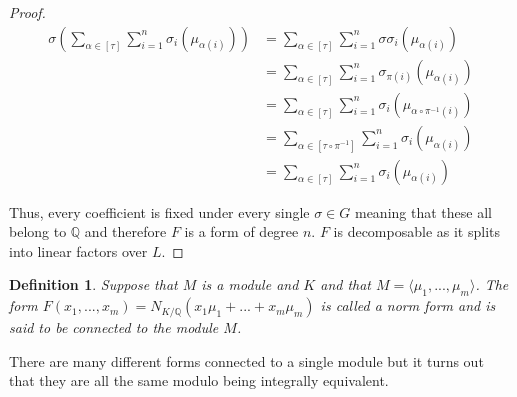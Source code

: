 \documentclass{article}
\newtheorem{definition}{Definition}[section]
\newcommand{\mbb}[1]{\mathbb{#1}}
\numberwithin{equation}{section}
\begin{document}
\begin{proof}
\begin{align*}
	\sigma(\sum_{\alpha \in [\tau]} \sum_{i=1}^n \sigma_i(\mu_{\alpha(i)})) &= \sum_{\alpha \in [\tau]} \sum_{i=1}^n \sigma \sigma_i(\mu_{\alpha(i)})  \\
	&= \sum_{\alpha \in [\tau]} \sum_{i=1}^n \sigma_{\pi(i)}(\mu_{\alpha(i)}) \\
	&= \sum_{\alpha \in [\tau]} \sum_{i=1}^n \sigma_{i}(\mu_{\alpha \circ \pi^{-1}(i)}) \\
	&= \sum_{\alpha \in [\tau \circ \pi^{-1}]} \sum_{i=1}^n \sigma_{i}(\mu_{\alpha (i)}) \\
	&= \sum_{\alpha \in [\tau]} \sum_{i=1}^n \sigma_i(\mu_{\alpha(i)})
\end{align*}

Thus, every coefficient is fixed under every single $\sigma \in G$ meaning that these all belong to $\mbb Q$ and therefore $F$ is a form of degree $n$. $F$ is decomposable as it splits into linear factors over $L$.
\end{proof}


\begin{definition}
	Suppose that $M$ is a module and $K$ and that $M = \langle \mu_1, ..., \mu_m\rangle$. The form $F(x_1, ..., x_m) = N_{K / \mbb Q}(x_1 \mu_1 + ... + x_m \mu_m)$ is called a norm form and is said to be connected to the module $M$.
\end{definition}
There are many different forms connected to a single module but it turns out that they are all the same modulo being integrally equivalent.
\end{document}
